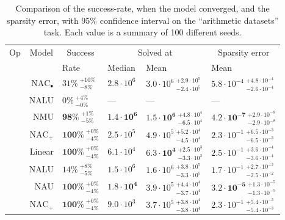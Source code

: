 \begin{table}[!h]

\caption{\label{tab:function-task-static-defaults}Comparison of the success-rate, when the model converged, and the sparsity error, with 95\% confidence interval on the ``arithmetic datasets'' task. Each value is a summary of 100 different seeds.}
\centering
\begin{tabular}{crllll}
\toprule
\multicolumn{1}{c}{Op} & \multicolumn{1}{c}{Model} & \multicolumn{1}{c}{Success} & \multicolumn{2}{c}{Solved at} & \multicolumn{1}{c}{Sparsity error} \\
\cmidrule(l{3pt}r{3pt}){1-1} \cmidrule(l{3pt}r{3pt}){2-2} \cmidrule(l{3pt}r{3pt}){3-3} \cmidrule(l{3pt}r{3pt}){4-5} \cmidrule(l{3pt}r{3pt}){6-6}
 &  & Rate & Median & Mean & Mean\\
\midrule
 & $\mathrm{NAC}_{\bullet}$ & $31\% {~}^{+10\%}_{-8\%}$ & $2.8 \cdot 10^{6}$ & $3.0 \cdot 10^{6} {~}^{+2.9 \cdot 10^{5}}_{-2.4 \cdot 10^{5}}$ & $5.8 \cdot 10^{-4} {~}^{+4.8 \cdot 10^{-4}}_{-2.6 \cdot 10^{-4}}$\\

\nopagebreak
 & NALU & $0\% {~}^{+4\%}_{-0\%}$ & --- & --- & ---\\

\nopagebreak
\multirow{-3}{*}{\centering\arraybackslash $\bm{\times}$} & NMU & $\mathbf{98\%} {~}^{+1\%}_{-5\%}$ & $\mathbf{1.4 \cdot 10^{6}}$ & $\mathbf{1.5 \cdot 10^{6}} {~}^{+4.8 \cdot 10^{4}}_{-6.5 \cdot 10^{4}}$ & $\mathbf{4.2 \cdot 10^{-7}} {~}^{+2.9 \cdot 10^{-8}}_{-2.9 \cdot 10^{-8}}$\\
\cmidrule{1-6}
 & $\mathrm{NAC}_{+}$ & $\mathbf{100\%} {~}^{+0\%}_{-4\%}$ & $2.5 \cdot 10^{5}$ & $4.9 \cdot 10^{5} {~}^{+5.2 \cdot 10^{4}}_{-4.5 \cdot 10^{4}}$ & $2.3 \cdot 10^{-1} {~}^{+6.5 \cdot 10^{-3}}_{-6.5 \cdot 10^{-3}}$\\

\nopagebreak
 & Linear & $\mathbf{100\%} {~}^{+0\%}_{-4\%}$ & $6.1 \cdot 10^{4}$ & $\mathbf{6.3 \cdot 10^{4}} {~}^{+2.5 \cdot 10^{3}}_{-3.3 \cdot 10^{3}}$ & $2.5 \cdot 10^{-1} {~}^{+3.6 \cdot 10^{-4}}_{-3.6 \cdot 10^{-4}}$\\

\nopagebreak
 & NALU & $14\% {~}^{+8\%}_{-5\%}$ & $1.5 \cdot 10^{6}$ & $1.6 \cdot 10^{6} {~}^{+3.8 \cdot 10^{5}}_{-3.3 \cdot 10^{5}}$ & $1.7 \cdot 10^{-1} {~}^{+2.7 \cdot 10^{-2}}_{-2.5 \cdot 10^{-2}}$\\

\nopagebreak
\multirow{-4}{*}{\centering\arraybackslash $\bm{+}$} & NAU & $\mathbf{100\%} {~}^{+0\%}_{-4\%}$ & $\mathbf{1.8 \cdot 10^{4}}$ & $3.9 \cdot 10^{5} {~}^{+4.4 \cdot 10^{4}}_{-3.7 \cdot 10^{4}}$ & $\mathbf{3.2 \cdot 10^{-5}} {~}^{+1.3 \cdot 10^{-5}}_{-1.3 \cdot 10^{-5}}$\\
\cmidrule{1-6}
 & $\mathrm{NAC}_{+}$ & $\mathbf{100\%} {~}^{+0\%}_{-4\%}$ & $9.0 \cdot 10^{3}$ & $3.7 \cdot 10^{5} {~}^{+3.8 \cdot 10^{4}}_{-3.8 \cdot 10^{4}}$ & $2.3 \cdot 10^{-1} {~}^{+5.4 \cdot 10^{-3}}_{-5.4 \cdot 10^{-3}}$\\


\end{tabular}
\end{table}
